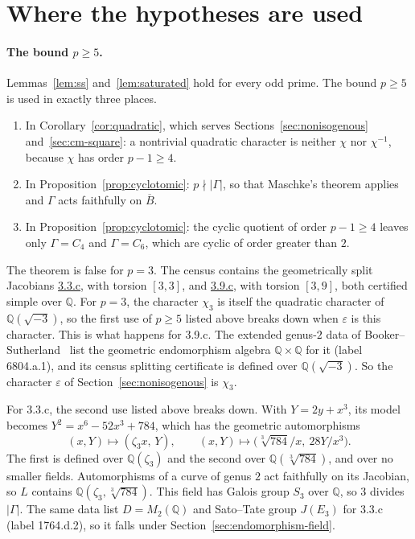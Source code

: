 \documentclass[11pt]{article}
\newcommand{\Q}{\mathbb Q}
\begin{document}
\section{Where the hypotheses are used}\label{sec:hypotheses}

\paragraph{The bound \(p\geq5\).} Lemmas~\ref{lem:ss}
and~\ref{lem:saturated} hold for every odd prime. The bound \(p\geq5\)
is used in exactly three places.
\begin{enumerate}
\item In Corollary~\ref{cor:quadratic}, which serves
Sections~\ref{sec:nonisogenous} and~\ref{sec:cm-square}: a nontrivial
quadratic character is neither \(\chi\) nor \(\chi^{-1}\), because
\(\chi\) has order \(p-1\geq4\).
\item In Proposition~\ref{prop:cyclotomic}: \(p\nmid|\Gamma|\), so
that Maschke's theorem applies and \(\Gamma\) acts faithfully on
\(\overline B\).
\item In Proposition~\ref{prop:cyclotomic}: the cyclic quotient of
order \(p-1\geq4\) leaves only \(\Gamma=C_4\) and \(\Gamma=C_6\), which
are cyclic of order greater than \(2\).
\end{enumerate}

The theorem is false for \(p=3\). The census contains the geometrically
split Jacobians
\href{https://genus-2-torsion.github.io/curve.html?id=3.3.c}{3.3.c},
with torsion
\href{https://genus-2-torsion.github.io/group.html?g=3.3}{\([3,3]\)},
and \href{https://genus-2-torsion.github.io/curve.html?id=3.9.c}{3.9.c},
with torsion
\href{https://genus-2-torsion.github.io/group.html?g=3.9}{\([3,9]\)},
both certified simple over \(\Q\). For \(p=3\), the character
\(\chi_3\) is itself the quadratic character of \(\Q(\sqrt{-3})\), so
the first use of \(p\geq5\) listed above breaks down when \(\varepsilon\) is this character. This is what
happens for 3.9.c. The extended genus-\(2\) data of
Booker--Sutherland~\cite{BookerSutherland} list the geometric
endomorphism algebra \(\Q\times\Q\) for it (label 6804.a.1), and its
census splitting certificate is defined over \(\Q(\sqrt{-3})\). So the
character \(\varepsilon\) of Section~\ref{sec:nonisogenous} is
\(\chi_3\).

For 3.3.c, the second use listed above breaks down. With \(Y=2y+x^3\), its model becomes
\(Y^2=x^6-52x^3+784\), which has the geometric automorphisms
\[
 (x,Y)\mapsto(\zeta_3x,\,Y),\qquad
 (x,Y)\mapsto\bigl(\sqrt[3]{784}/x,\ 28Y/x^3\bigr).
\]
The first is defined over \(\Q(\zeta_3)\) and the second over
\(\Q(\sqrt[3]{784})\), and over no smaller fields. Automorphisms of a
curve of genus \(2\) act faithfully on its Jacobian, so \(L\) contains
\(\Q(\zeta_3,\sqrt[3]{784})\). This field has Galois group \(S_3\) over
\(\Q\), so \(3\) divides \(|\Gamma|\). The same data list
\(D=M_2(\Q)\) and Sato--Tate group \(J(E_3)\) for 3.3.c (label
1764.d.2), so it falls under Section~\ref{sec:endomorphism-field}.
\end{document}
